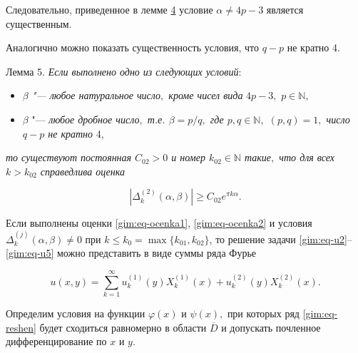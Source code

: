 Следовательно, приведенное в лемме \hyperlink{gim:l4}{4} условие $\alpha\ne 4p-3$ является существенным. 

Аналогично можно показать существенность условия, что  $q-p$ не кратно 4.



\smallskip



\hypertarget{gim:l5}{}



{\small\sc Лемма 5.} {\it Если выполнено одно из следующих условий}\/:

\begin{itemize}

\item[1)] {\it $\beta$ "--- любое натуральное число$,$ кроме чисел вида} $4p-3,$ $p\in \mathbb{N},$ 

\item[2)] $\beta$ "--- {\it любое дробное число$,$ т.е. $\beta=p/q,$ где $p, q\in \mathbb{N},$ $(p,q)=1,$ число $q-p$ не кратно} 4,

\end{itemize} 

{\it   то существуют постоянная $C_{02}>0$ и номер $ k_{02}\in \mathbb{N}$ такие$,$ что для всех $k>k_{02}$ справедлива оценка}

\begin{equation}

|\Delta_{k}^{(2)}(\alpha,\beta)|\ge C_{02} e^{\pi k\alpha}.

\label{gim:eq-ocenka2}

\end{equation}



\smallskip



Если выполнены оценки \eqref{gim:eq-ocenka1}, \eqref{gim:eq-ocenka2} и условия $\Delta_k^{(j)}(\alpha,\beta)\ne0$  при $k\le k_0=\max\{k_{01}, k_{02}\}$, то решение задачи \eqref{gim:eq-u2}--\eqref{gim:eq-u5} можно представить в виде суммы ряда Фурье

\begin{equation}

u(x,y)=\sum\limits_{k=1}^\infty u_k^{(1)}(y) X_k^{(1)}(x)+u_k^{(2)}(y) X_k^{(2)}(x).

\label{gim:eq-reshen}

\end{equation}



Определим условия на функции $\varphi(x)$ и $\psi(x),$ при которых ряд \eqref{gim:eq-reshen} будет сходиться равномерно в области $\overline D$ и допускать почленное дифференцирование по $x$ и $y.$



